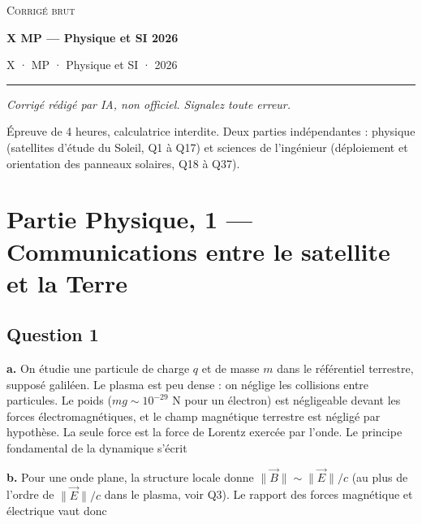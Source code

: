 \documentclass[11pt,a4paper]{article}
\newcommand{\equationajustee}[1]{%
  \sbox{\boiteequation}{$\displaystyle #1$}%
  \ifdim\wd\boiteequation>\linewidth
    \[\resizebox{\linewidth}{!}{\usebox{\boiteequation}}\]%
  \else
    \[#1\]%
  \fi}
\begin{document}
\thispagestyle{plain}
\begin{center}
  {\small\scshape Corrigé brut}\par\smallskip
  {\LARGE\bfseries X MP — Physique et SI 2026\par}\medskip
  {\large X · MP · Physique et SI · 2026\par}
\end{center}
\vspace{2pt}\hrule\vspace{8pt}

\emph{Corrigé rédigé par IA, non officiel. Signalez toute erreur.}

Épreuve de 4 heures, calculatrice interdite. Deux parties indépendantes : physique (satellites d'étude du Soleil, Q1 à Q17) et sciences de l'ingénieur (déploiement et orientation des panneaux solaires, Q18 à Q37).

\hypertarget{partie-physique-1-communications-entre-le-satellite-et-la-terre}{%
\section{Partie Physique, 1 --- Communications entre le satellite et la Terre}\label{partie-physique-1-communications-entre-le-satellite-et-la-terre}}

\hypertarget{question-1}{%
\subsection{Question 1}\label{question-1}}

\textbf{a.} On étudie une particule de charge \(q\) et de masse \(m\) dans le référentiel terrestre, supposé galiléen. Le plasma est peu dense : on néglige les collisions entre particules. Le poids (\(mg\sim10^{-29}\) N pour un électron) est négligeable devant les forces électromagnétiques, et le champ magnétique terrestre est négligé par hypothèse. La seule force est la force de Lorentz exercée par l'onde. Le principe fondamental de la dynamique s'écrit

\equationajustee{\boxed{m\,\frac{\mathrm d\vec v}{\mathrm dt}=q\left(\vec E(\vec r,t)+\vec v\wedge\vec B(\vec r,t)\right)}}

\textbf{b.} Pour une onde plane, la structure locale donne \(\|\vec B\|\sim\|\vec E\|/c\) (au plus de l'ordre de \(\|\vec E\|/c\) dans le plasma, voir Q3). Le rapport des forces magnétique et électrique vaut donc

\equationajustee{\frac{\|q\,\vec v\wedge\vec B\|}{\|q\,\vec E\|}\lesssim\frac{vB}{E}\sim\frac{v}{c}\ll1 .}
\end{document}
